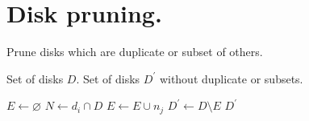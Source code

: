 \documentclass[journal,onecolumn]{IEEEtran}
\begin{document}
\newpage

\section{Disk pruning.}\label{app:disks}

\begin{algorithm}
    \caption{Prune disks which are duplicate or subset of others.}
    \begin{algorithmic}[1]
        \Require Set of disks $D$.
        \Ensure Set of disks $D^{\prime}$ without duplicate or subsets.
        
        \State $E \gets \varnothing$
            \State $N \gets d_i \cap D$
                        \State $E \gets E \cup {n_j}$
                \EndIf
            \EndFor
        \EndFor        
        \State $D^{\prime} \gets D \setminus E$
        \State \Return $D^{\prime}$
        \EndFunction
    \end{algorithmic}
\end{algorithm}



\end{document}
